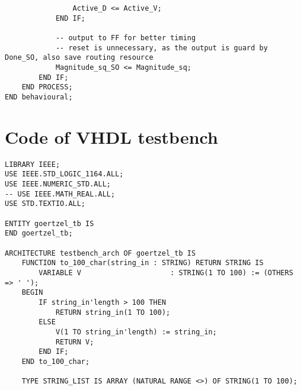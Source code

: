 \begin{lstlisting}
                Active_D <= Active_V;
            END IF;

            -- output to FF for better timing
            -- reset is unnecessary, as the output is guard by Done_SO, also save routing resource
            Magnitude_sq_SO <= Magnitude_sq;
        END IF;
    END PROCESS;
END behavioural;
\end{lstlisting}

\section{Code of VHDL testbench}

\lstset{language=VHDL}
\begin{lstlisting}
LIBRARY IEEE;
USE IEEE.STD_LOGIC_1164.ALL;
USE IEEE.NUMERIC_STD.ALL;
-- USE IEEE.MATH_REAL.ALL;
USE STD.TEXTIO.ALL;

ENTITY goertzel_tb IS
END goertzel_tb;

ARCHITECTURE testbench_arch OF goertzel_tb IS
    FUNCTION to_100_char(string_in : STRING) RETURN STRING IS
        VARIABLE V                     : STRING(1 TO 100) := (OTHERS => ' ');
    BEGIN
        IF string_in'length > 100 THEN
            RETURN string_in(1 TO 100);
        ELSE
            V(1 TO string_in'length) := string_in;
            RETURN V;
        END IF;
    END to_100_char;

    TYPE STRING_LIST IS ARRAY (NATURAL RANGE <>) OF STRING(1 TO 100);


\end{lstlisting}
